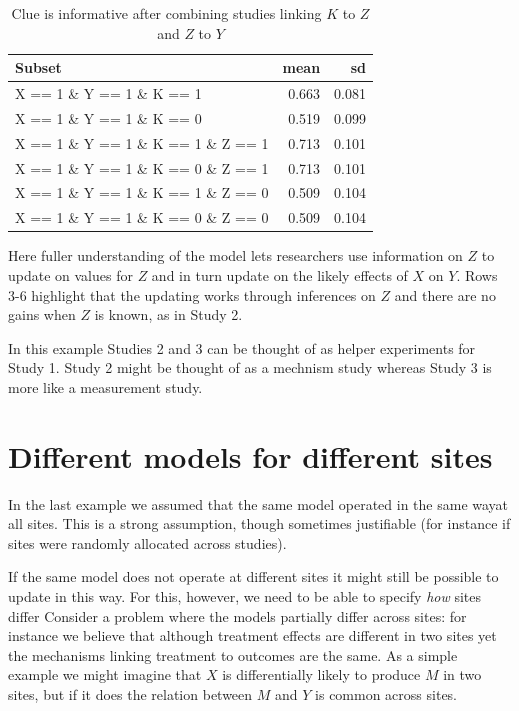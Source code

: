 \documentclass[12pt,]{book}
\begin{document}
\begin{table}[t]

\caption{\label{tab:frank4}Clue is informative after combining studies linking $K$ to $Z$ and $Z$ to $Y$}
\centering
\begin{tabular}{l|r|r}
\hline
Subset & mean & sd\\
\hline
X == 1 \& Y == 1 \& K == 1 & 0.663 & 0.081\\
\hline
X == 1 \& Y == 1 \& K == 0 & 0.519 & 0.099\\
\hline
X == 1 \& Y == 1 \& K == 1 \& Z == 1 & 0.713 & 0.101\\
\hline
X == 1 \& Y == 1 \& K == 0 \& Z == 1 & 0.713 & 0.101\\
\hline
X == 1 \& Y == 1 \& K == 1 \& Z == 0 & 0.509 & 0.104\\
\hline
X == 1 \& Y == 1 \& K == 0 \& Z == 0 & 0.509 & 0.104\\
\hline
\end{tabular}
\end{table}

Here fuller understanding of the model lets researchers use information on \(Z\) to update on values for \(Z\) and in turn update on the likely effects of \(X\) on \(Y\). Rows 3-6 highlight that the updating works through inferences on \(Z\) and there are no gains when \(Z\) is known, as in Study 2.

In this example Studies 2 and 3 can be thought of as helper experiments for Study 1. Study 2 might be thought of as a mechnism study whereas Study 3 is more like a measurement study.

\hypertarget{different-models-for-different-sites}{%
\section{Different models for different sites}\label{different-models-for-different-sites}}

In the last example we assumed that the same model operated in the same wayat all sites. This is a strong assumption, though sometimes justifiable (for instance if sites were randomly allocated across studies).

If the same model does not operate at different sites it might still be possible to update in this way. For this, however, we need to be able to specify \emph{how} sites differ Consider a problem where the models partially differ across sites: for instance we believe that although treatment effects are different in two sites yet the mechanisms linking treatment to outcomes are the same. As a simple example we might imagine that \(X\) is differentially likely to produce \(M\) in two sites, but if it does the relation between \(M\) and \(Y\) is common across sites.
\end{document}
